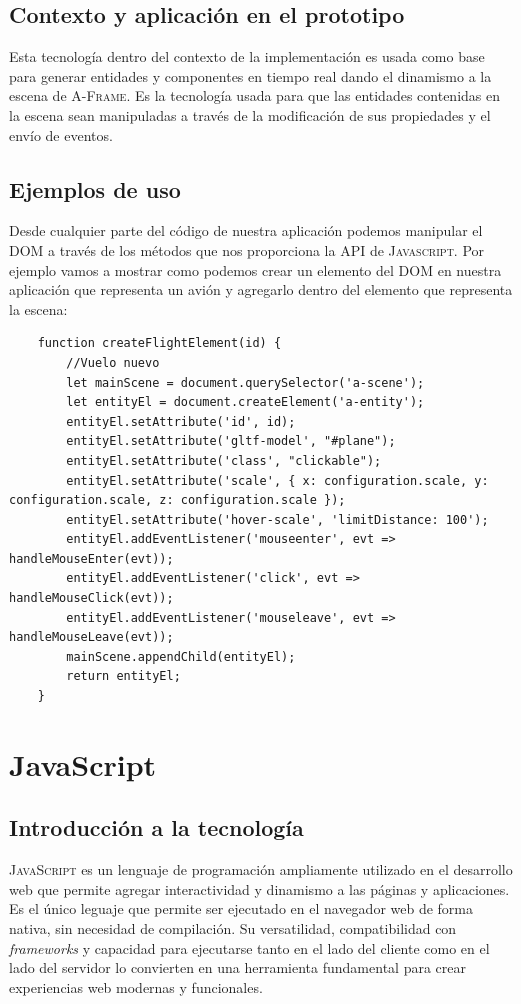 \documentclass[a4paper, 11pt]{book}
\begin{document}
\subsection{Contexto y aplicación en el prototipo}
Esta tecnología dentro del contexto de la implementación es usada como base para generar entidades y componentes en tiempo real dando el dinamismo a la escena de \textsc{A-Frame}. Es la tecnología usada para que las entidades contenidas en la escena sean manipuladas a través de la modificación de sus propiedades y el envío de eventos.
\subsection{Ejemplos de uso}
Desde cualquier parte del código de nuestra aplicación podemos manipular el \textsc{DOM} a través de los métodos que nos proporciona la \textsc{\gls{API}} de \textsc{Javascript}. Por ejemplo vamos a mostrar como podemos crear un elemento del DOM en nuestra aplicación que representa un avión y agregarlo dentro del elemento que representa la escena:
\begin{verbatim}
	function createFlightElement(id) {
		//Vuelo nuevo
		let mainScene = document.querySelector('a-scene');
		let entityEl = document.createElement('a-entity');
		entityEl.setAttribute('id', id);
		entityEl.setAttribute('gltf-model', "#plane");
		entityEl.setAttribute('class', "clickable");
		entityEl.setAttribute('scale', { x: configuration.scale, y: configuration.scale, z: configuration.scale });
		entityEl.setAttribute('hover-scale', 'limitDistance: 100');
		entityEl.addEventListener('mouseenter', evt => handleMouseEnter(evt));
		entityEl.addEventListener('click', evt => handleMouseClick(evt));
		entityEl.addEventListener('mouseleave', evt => handleMouseLeave(evt));
		mainScene.appendChild(entityEl);
		return entityEl;
	}
\end{verbatim}
\section{JavaScript}
\label{sec:javascript}
\subsection{Introducción a la tecnología}
\textsc{JavaScript} es un lenguaje de programación ampliamente utilizado en el desarrollo web que permite agregar interactividad y dinamismo a las páginas y aplicaciones. Es el único leguaje que permite ser ejecutado en el navegador web de forma nativa, sin necesidad de compilación. Su versatilidad, compatibilidad con \emph{\gls{framework}s} y capacidad para ejecutarse tanto en el lado del cliente como en el lado del servidor lo convierten en una herramienta fundamental para crear experiencias web modernas y funcionales.
\end{document}

